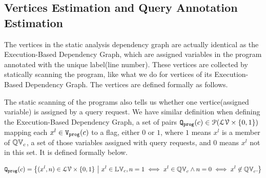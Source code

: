 \subsection{Vertices Estimation and Query Annotation Estimation}
\label{sec:alg_vertexgen}
The vertices in the static analysis dependency graph are actually identical as the  Execution-Based Dependency Graph, which are assigned variables in the program annotated with the unique label(line number). These vertices are collected by statically scanning the program, like what we do for vertices of its Execution-Based Dependency Graph. The vertices are defined formally as follows.


The static scanning of the programs also tells us whether one vertice(assigned variable) is assigned by a query request. We have similar definition when defining the Execution-Based Dependency Graph, 
a set of pairs $\mathtt{{Q_{prog}}}(c) \in \mathcal{P}(\mathcal{LV} \times \{0, 1\} )$ 
mapping each $x^l \in \mathtt{{V_{prog}}}(c)$ to a flag, either $0$ or $1$, where $1$  means $x^{l}$ is a member of $ \mathbb{QV}_{c}$, a set of those variables assigned with query requests, and $0$ means $x^{l}$ not in this set. It is defined formally below.

\[\progF(c) =\left\{(x^l, n)  \in  \mathcal{LV} \times \{0, 1\} 
~ \middle\vert ~
x^l \in \lvar_{c},
n = 1 \iff x^l \in \qvar_{c} \land n = 0 \iff  x^l \not\in \qvar_{c} .
\right\}\]
%


